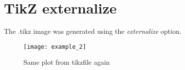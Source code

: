 

\section{TikZ externalize}

The .tikz image was generated using the \emph{externalize} option.

\begin{figure}[htbp]
    \texttt{[image: example\_2]}
    \caption{Same plot from tikzfile again}
    \label{tikz:fig:example:1}
\end{figure}
